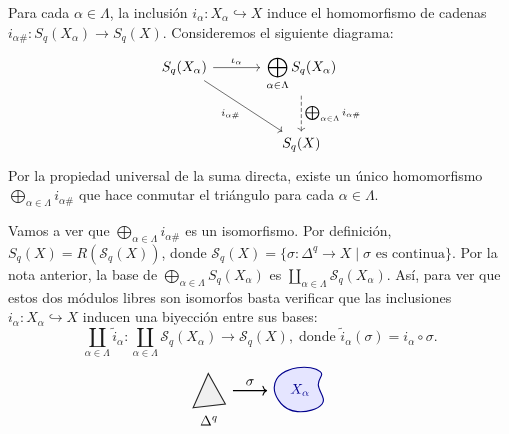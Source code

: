 \begin{dem}
Para cada $\alpha \in \Lambda$, la inclusión $i_\alpha \colon X_\alpha \hookrightarrow X$ induce el homomorfismo de cadenas $i_{\alpha\#} \colon S_q(X_\alpha) \to S_q(X)$. Consideremos el siguiente diagrama:
\[
\begin{tikzcd}[column sep=3.4em, row sep=2.6em]
S_q(X_\alpha) \arrow[r, "\iota_\alpha"] \arrow[dr, "i_{\alpha\#}"'] & \displaystyle\bigoplus_{\alpha \in \Lambda} S_q(X_\alpha) \arrow[d, dashed, "{\bigoplus_{\alpha \in \Lambda} i_{\alpha\#}}"] \\
& S_q(X)
\end{tikzcd}
\]
Por la propiedad universal de la suma directa, existe un único homomorfismo $\bigoplus_{\alpha \in \Lambda} i_{\alpha\#}$ que hace conmutar el triángulo para cada $\alpha \in \Lambda$.

Vamos a ver que $\bigoplus_{\alpha \in \Lambda} i_{\alpha\#}$ es un isomorfismo. Por definición, $S_q(X) = R(\mathcal{S}_q(X))$, donde $\mathcal{S}_q(X) = \{\sigma \colon \Delta^q \to X \mid \sigma \text{ es continua}\}$. Por la nota anterior, la base de $\bigoplus_{\alpha \in \Lambda} S_q(X_\alpha)$ es $\coprod_{\alpha \in \Lambda} \mathcal{S}_q(X_\alpha)$. Así, para ver que estos dos módulos libres son isomorfos basta verificar que las inclusiones $i_\alpha \colon X_\alpha \hookrightarrow X$ inducen una biyección entre sus bases:
\[
\coprod_{\alpha \in \Lambda} \tilde{i}_\alpha \colon \coprod_{\alpha \in \Lambda} \mathcal{S}_q(X_\alpha) \longrightarrow \mathcal{S}_q(X), \; \text{donde } \tilde{i}_\alpha(\sigma) = i_\alpha \circ \sigma.
\]
\[
\begin{tikzpicture}[baseline=(current bounding box.center), scale=0.95]
    \fill[gray!12] (-0.4, 0.55) -- (0.45, 0.65) -- (0.0, 1.45) -- cycle;
    \draw[thick, black!85] (-0.4, 0.55) -- (0.45, 0.65) -- (0.0, 1.45) -- cycle;
    \node[below] at (0.02, 0.48) {$\Delta^q$};

    \draw[->, thick] (0.65, 1.0) -- (1.55, 1.0) node[midway, above] {$\sigma$};

    \fill[blue!10] plot[smooth cycle, tension=0.75] coordinates {
        (1.85, 0.75) (2.35, 0.45) (3.0, 0.65) (2.9, 1.15) (2.95, 1.5) (2.35, 1.6) (1.8, 1.3)
    };
    \draw[thick, blue!55!black] plot[smooth cycle, tension=0.75] coordinates {
        (1.85, 0.75) (2.35, 0.45) (3.0, 0.65) (2.9, 1.15) (2.95, 1.5) (2.35, 1.6) (1.8, 1.3)
    };
    \node[blue!55!black] at (2.42, 1.02) {$X_\alpha$};


\end{tikzpicture}\]
\end{dem}
